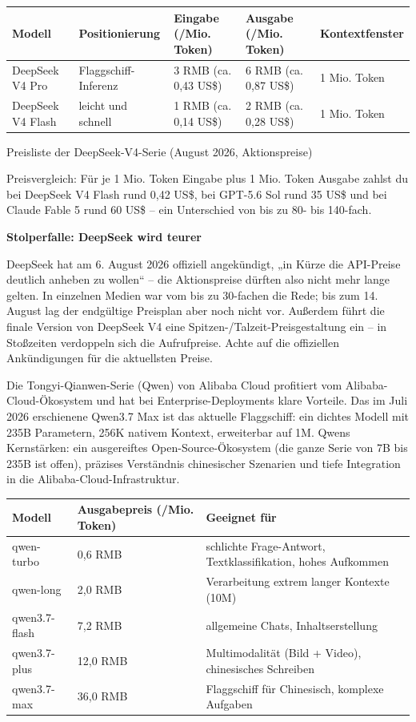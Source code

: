 \begin{center}
\begin{tabularx}{\linewidth}{|X|X|X|X|X|}
\hline
\textbf{Modell} & \textbf{Positionierung} & \textbf{Eingabe (/Mio. Token)} & \textbf{Ausgabe (/Mio. Token)} & \textbf{Kontextfenster} \tabularnewline
\hline
DeepSeek V4 Pro & Flaggschiff-Inferenz & 3 RMB (ca. 0,43 US\$) & 6 RMB (ca. 0,87 US\$) & 1 Mio. Token \tabularnewline
DeepSeek V4 Flash & leicht und schnell & 1 RMB (ca. 0,14 US\$) & 2 RMB (ca. 0,28 US\$) & 1 Mio. Token \tabularnewline
\hline
\end{tabularx}
\end{center}

\begin{center}\small\color{gray}Preisliste der DeepSeek-V4-Serie (August 2026, Aktionspreise)\end{center}

Preisvergleich: Für je 1 Mio. Token Eingabe plus 1 Mio. Token Ausgabe zahlst du bei DeepSeek V4 Flash rund 0,42 US\$, bei GPT-5.6 Sol rund 35 US\$ und bei Claude Fable 5 rund 60 US\$ – ein Unterschied von bis zu 80- bis 140-fach.

\textbf{Stolperfalle: DeepSeek wird teurer}\par

DeepSeek hat am 6. August 2026 offiziell angekündigt, „in Kürze die API-Preise deutlich anheben zu wollen“ – die Aktionspreise dürften also nicht mehr lange gelten. In einzelnen Medien war vom bis zu 30-fachen die Rede; bis zum 14. August lag der endgültige Preisplan aber noch nicht vor. Außerdem führt die finale Version von DeepSeek V4 eine Spitzen-/Talzeit-Preisgestaltung ein – in Stoßzeiten verdoppeln sich die Aufrufpreise. Achte auf die offiziellen Ankündigungen für die aktuellsten Preise.


Die Tongyi-Qianwen-Serie (Qwen) von Alibaba Cloud profitiert vom Alibaba-Cloud-Ökosystem und hat bei Enterprise-Deployments klare Vorteile. Das im Juli 2026 erschienene Qwen3.7 Max ist das aktuelle Flaggschiff: ein dichtes Modell mit 235B Parametern, 256K nativem Kontext, erweiterbar auf 1M. Qwens Kernstärken: ein ausgereiftes Open-Source-Ökosystem (die ganze Serie von 7B bis 235B ist offen), präzises Verständnis chinesischer Szenarien und tiefe Integration in die Alibaba-Cloud-Infrastruktur.

\begin{center}
\begin{tabularx}{\linewidth}{|X|X|X|}
\hline
\textbf{Modell} & \textbf{Ausgabepreis (/Mio. Token)} & \textbf{Geeignet für} \tabularnewline
\hline
qwen-turbo & 0,6 RMB & schlichte Frage-Antwort, Textklassifikation, hohes Aufkommen \tabularnewline
qwen-long & 2,0 RMB & Verarbeitung extrem langer Kontexte (10M) \tabularnewline
qwen3.7-flash & 7,2 RMB & allgemeine Chats, Inhaltserstellung \tabularnewline
qwen3.7-plus & 12,0 RMB & Multimodalität (Bild + Video), chinesisches Schreiben \tabularnewline
qwen3.7-max & 36,0 RMB & Flaggschiff für Chinesisch, komplexe Aufgaben \tabularnewline
\hline
\end{tabularx}
\end{center}

